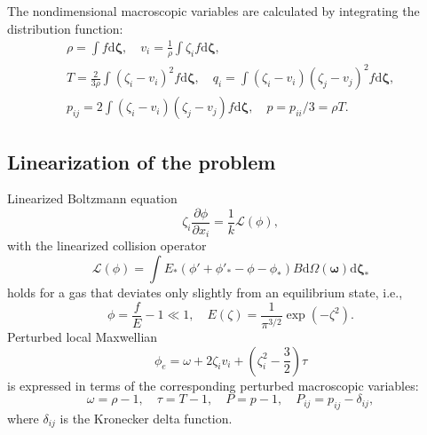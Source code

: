 \documentclass[]{elsarticle} %
\newcommand{\dd}{\mathrm{d}}
\newcommand{\pder}[2][]{\frac{\partial#1}{\partial#2}}
\newcommand{\dzeta}{\boldsymbol{\dd\zeta}}
\begin{document}
The nondimensional macroscopic variables are calculated by integrating the distribution function:
\begin{equation}\label{eq:macro}
    \begin{gathered}
    \rho = \int f \dzeta, \quad
    v_i = \frac1{\rho} \int \zeta_i f \dzeta, \\
    T = \frac{2}{3\rho}\int(\zeta_i-v_i)^2 f \dzeta, \quad
    q_i = \int(\zeta_i-v_i)(\zeta_j-v_j)^2 f \dzeta, \\
    p_{ij} = 2 \int(\zeta_i-v_i)(\zeta_j-v_j) f \dzeta,
        \quad p = p_{ii}/3 = \rho T.
    \end{gathered}
\end{equation}

\subsection{Linearization of the problem}

Linearized Boltzmann equation
\begin{equation}\label{eq:linear_Boltzmann}
    \zeta_i \pder[\phi]{x_i} = \frac1k \mathcal{L}(\phi),
\end{equation}
with the linearized collision operator
\begin{equation}\label{eq:linear_ci}
    \mathcal{L}(\phi) = \int E_*(\phi'+\phi'_*-\phi-\phi_*) B
    \dd \Omega(\boldsymbol{\omega}) \dzeta_*
\end{equation}
holds for a gas that deviates only slightly from an equilibrium state, i.e.,
\begin{equation}\label{eq:linear_condition}
    \phi = \frac{f}{E} - 1 \ll 1, \quad E(\zeta) = \frac1{\pi^{3/2}}\exp\left(-\zeta^2\right).
\end{equation}
Perturbed local Maxwellian
\begin{equation}\label{eq:linear_maxwellian}
    \phi_e = \omega + 2\zeta_i v_i + \left(\zeta_i^2-\frac32\right)\tau
\end{equation}
is expressed in terms of the corresponding perturbed macroscopic variables:
\begin{equation}\label{eq:perturbed_variables}
    \omega = \rho-1, \quad \tau = T-1, \quad P = p-1, \quad P_{ij} = p_{ij}-\delta_{ij},
\end{equation}
where \(\delta_{ij}\) is the Kronecker delta function.
\end{document}
